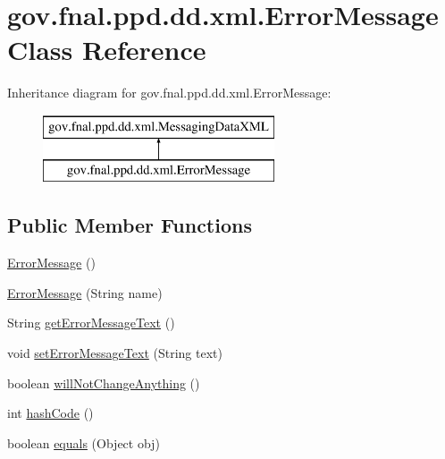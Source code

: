 \hypertarget{classgov_1_1fnal_1_1ppd_1_1dd_1_1xml_1_1ErrorMessage}{\section{gov.\-fnal.\-ppd.\-dd.\-xml.\-Error\-Message Class Reference}
\label{classgov_1_1fnal_1_1ppd_1_1dd_1_1xml_1_1ErrorMessage}
}
Inheritance diagram for gov.\-fnal.\-ppd.\-dd.\-xml.\-Error\-Message\-:\begin{figure}[H]
\begin{center}
\leavevmode
\includegraphics[height=2.000000cm]{classgov_1_1fnal_1_1ppd_1_1dd_1_1xml_1_1ErrorMessage}
\end{center}
\end{figure}
\subsection*{Public Member Functions}
\begin{DoxyCompactItemize}
\item 
\hyperlink{classgov_1_1fnal_1_1ppd_1_1dd_1_1xml_1_1ErrorMessage_a9210f3e300e2c0961de7a1742389454e}{Error\-Message} ()
\item 
\hyperlink{classgov_1_1fnal_1_1ppd_1_1dd_1_1xml_1_1ErrorMessage_a20c56047229852f141ad657497d36b3d}{Error\-Message} (String name)
\item 
String \hyperlink{classgov_1_1fnal_1_1ppd_1_1dd_1_1xml_1_1ErrorMessage_ac346f500e04be35960d80693882ff122}{get\-Error\-Message\-Text} ()
\item 
void \hyperlink{classgov_1_1fnal_1_1ppd_1_1dd_1_1xml_1_1ErrorMessage_aa67ba64ad1acae4e25a6854baa57082d}{set\-Error\-Message\-Text} (String text)
\item 
boolean \hyperlink{classgov_1_1fnal_1_1ppd_1_1dd_1_1xml_1_1ErrorMessage_a67ebc471081d32a5d55667f810f43922}{will\-Not\-Change\-Anything} ()
\item 
int \hyperlink{classgov_1_1fnal_1_1ppd_1_1dd_1_1xml_1_1ErrorMessage_a7bc631ea7c6078efdd1a0a20200a6912}{hash\-Code} ()
\item 
boolean \hyperlink{classgov_1_1fnal_1_1ppd_1_1dd_1_1xml_1_1ErrorMessage_ad56cd30cfdccf540a65f09a63fb72b89}{equals} (Object obj)
\end{DoxyCompactItemize}


